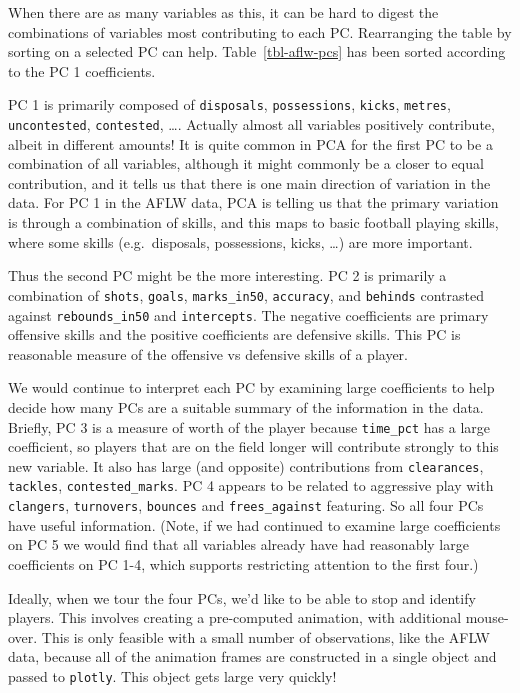 \documentclass[
  letterpaper,
]{book}
\begin{document}
When there are as many variables as this, it can be hard to digest the
combinations of variables most contributing to each PC. Rearranging the
table by sorting on a selected PC can help. Table~\ref{tbl-aflw-pcs} has
been sorted according to the PC 1 coefficients.

PC 1 is primarily composed of \texttt{disposals}, \texttt{possessions},
\texttt{kicks}, \texttt{metres}, \texttt{uncontested},
\texttt{contested}, \ldots. Actually almost all variables positively
contribute, albeit in different amounts! It is quite common in PCA for
the first PC to be a combination of all variables, although it might
commonly be a closer to equal contribution, and it tells us that there
is one main direction of variation in the data. For PC 1 in the AFLW
data, PCA is telling us that the primary variation is through a
combination of skills, and this maps to basic football playing skills,
where some skills (e.g.~disposals, possessions, kicks, \ldots) are more
important.

Thus the second PC might be the more interesting. PC 2 is primarily a
combination of \texttt{shots}, \texttt{goals}, \texttt{marks\_in50},
\texttt{accuracy}, and \texttt{behinds} contrasted against
\texttt{rebounds\_in50} and \texttt{intercepts}. The negative
coefficients are primary offensive skills and the positive coefficients
are defensive skills. This PC is reasonable measure of the offensive vs
defensive skills of a player.

We would continue to interpret each PC by examining large coefficients
to help decide how many PCs are a suitable summary of the information in
the data. Briefly, PC 3 is a measure of worth of the player because
\texttt{time\_pct} has a large coefficient, so players that are on the
field longer will contribute strongly to this new variable. It also has
large (and opposite) contributions from \texttt{clearances},
\texttt{tackles}, \texttt{contested\_marks}. PC 4 appears to be related
to aggressive play with \texttt{clangers}, \texttt{turnovers},
\texttt{bounces} and \texttt{frees\_against} featuring. So all four PCs
have useful information. (Note, if we had continued to examine large
coefficients on PC 5 we would find that all variables already have had
reasonably large coefficients on PC 1-4, which supports restricting
attention to the first four.)

Ideally, when we tour the four PCs, we'd like to be able to stop and
identify players. This involves creating a pre-computed animation, with
additional mouse-over. This is only feasible with a small number of
observations, like the AFLW data, because all of the animation frames
are constructed in a single object and passed to \texttt{plotly}. This
object gets large very quickly!
\end{document}
